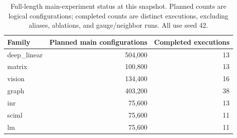 \begin{table}[ht]
\centering\small
\caption{Full-length main-experiment status at this snapshot. Planned counts are logical configurations; completed counts are distinct executions, excluding aliases, ablations, and gauge/neighbor runs. All use seed 42.}
\label{tab:new-coverage}
\begin{tabular}{lrr}
\toprule Family & Planned main configurations & Completed executions \\
\midrule
deep\_linear & 504,000 & 13 \\
matrix & 100,800 & 13 \\
vision & 134,400 & 16 \\
graph & 403,200 & 38 \\
inr & 75,600 & 13 \\
sciml & 75,600 & 11 \\
lm & 75,600 & 11 \\
\bottomrule
\end{tabular}
\end{table}
